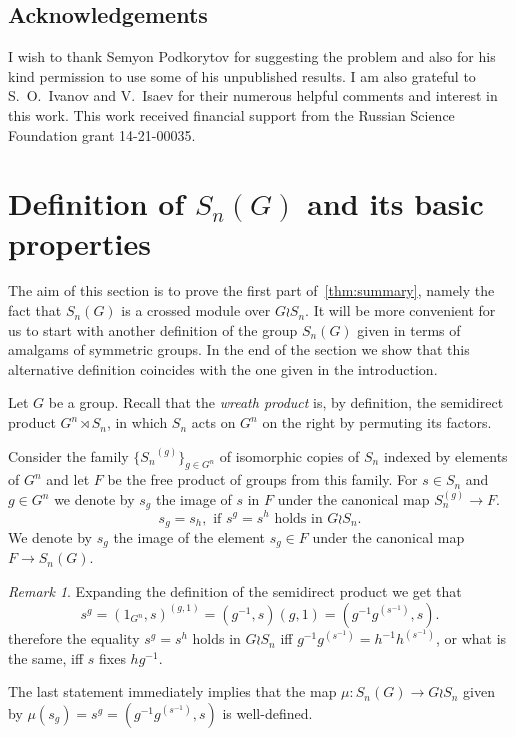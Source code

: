 \documentclass[oneside, 10pt]{amsart}
\theoremstyle{plain}
\numberwithin{equation}{section}
\numberwithin{lemma}{section}
\theoremstyle{remark}
\newtheorem{rem}[lemma]{Remark}
\theoremstyle{definition}
\begin{document}
\subsection{Acknowledgements}
I wish to thank Semyon Podkorytov for suggesting the problem and also for his kind permission to use some of his unpublished results.
I am also grateful to S.~O.~Ivanov and V.~Isaev for their numerous helpful comments and interest in this work.
This work received financial support from the Russian Science Foundation grant 14-21-00035.

\section{Definition of $S_n(G)$ and its basic properties} 
The aim of this section is to prove the first part of~\cref{thm:summary}, namely the fact that $S_n(G)$ is a crossed module over $G \wr S_n$.
It will be more convenient for us to start with another definition of the group $S_n(G)$ given in terms of amalgams of symmetric groups.
In the end of the section we show that this alternative definition coincides with the one given in the introduction.

Let $G$ be a group. Recall that the {\it wreath product} is, by definition,
the semidirect product $G^n \rtimes S_n$, in which $S_n$ acts on $G^n$ on the right by permuting its factors.

Consider the family $\{{S_n}^{(g)}\}_{g\in G^n}$ of isomorphic copies of $S_n$ indexed by elements of $G^n$ and let $F$ be the free product of groups from this family.
For $s\in S_n$ and $g\in G^n$ we denote by 
$s_{g}$ the image of $s$ in $F$ under the canonical map $S_n^{(g)} \to F$.
\begin{equation} \label{eq:main_rel} s_{g} = s_{h}, \text{ if $s^g = s^h$ holds in $G \wr S_n$.} \end{equation}
We denote by $s_g$ the image of the element $s_g\in F$ under the canonical map $F\to S_n(G)$.

\begin{rem}
Expanding the definition of the semidirect product we get that
\begin{equation} \nonumber s^g = (1_{G^n}, s)^{(g, 1)} = (g^{-1}, s) (g, 1) = (g^{-1} g^{(s^{-1})}, s). \end{equation}
therefore the equality $s^g = s^h$ holds in $G \wr S_n$ iff
$g^{-1} g^{(s^{-1})} = h^{-1} h^{(s^{-1})}$, or what is the same, iff $s$ fixes $hg^{-1}$.

The last statement immediately implies that the map $\mu \colon S_n(G) \to G \wr S_n$ given by $\mu(s_g) = s^g = (g^{-1}g^{(s^{-1})}, s)$
is well-defined. %
\end{rem}
\end{document}
